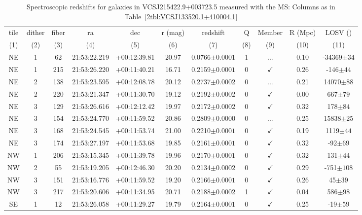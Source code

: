 \begin{landscape}
	\begin{table}
		\centering 
		\caption[Spectroscopic redshifts for galaxies in VCSJ215422.9+003723.5]{Spectroscopic redshifts for galaxies in VCSJ215422.9+003723.5 measured with the MS: Columns as in Table~\ref{2tbl:VCSJ133520.1+410004.1}}
		\begin{tabular}{ccccccccccc}
			\hline
			tile & dither & fiber & ra & dec & r (mag) & redshift & Q & Member & R (Mpc) & LOSV (\kms) \\
			(1) & (2) & (3) & (4) & (5) & (6) & (7) & (8) & (9) & (10) & (11) \\
			\hline \hline
	NE & 1 & 62 & 21:53:22.219 & +00:12:39.81 & 20.97 & 0.0766$\pm{0.0001}$ & 1 & ... & 0.10 & -34369$\pm{34}$ \\
	NE & 1 & 215 & 21:53:26.220 & +00:11:40.21 & 16.71 & 0.2159$\pm{0.0001}$ & 0 & $\checkmark$ & 0.26 & -146$\pm{44}$ \\
	NE & 2 & 138 & 21:53:23.595 & +00:12:08.78 & 20.12 & 0.2737$\pm{0.0002}$ & 0 & ... & 0.21 & 14070$\pm{88}$ \\
	NE & 2 & 220 & 21:53:21.347 & +00:11:30.70 & 19.12 & 0.2192$\pm{0.0002}$ & 0 & $\checkmark$ & 0.00 & 667$\pm{79}$ \\
	NE & 3 & 129 & 21:53:26.616 & +00:12:12.42 & 19.97 & 0.2172$\pm{0.0002}$ & 0 & $\checkmark$ & 0.32 & 178$\pm{84}$ \\
	NE & 3 & 154 & 21:53:24.770 & +00:11:59.52 & 20.86 & 0.2809$\pm{0.0000}$ & 0 & ... & 0.25 & 15838$\pm{25}$ \\
	NE & 3 & 168 & 21:53:24.545 & +00:11:53.74 & 21.00 & 0.2210$\pm{0.0001}$ & 0 & $\checkmark$ & 0.19 & 1119$\pm{44}$ \\
	NE & 3 & 174 & 21:53:27.197 & +00:11:53.68 & 19.85 & 0.2161$\pm{0.0001}$ & 0 & $\checkmark$ & 0.32 & -92$\pm{69}$ \\
	NW & 1 & 206 & 21:53:15.345 & +00:11:39.78 & 19.96 & 0.2170$\pm{0.0001}$ & 0 & $\checkmark$ & 0.32 & 131$\pm{44}$ \\
	NW & 2 & 55 & 21:53:19.205 & +00:12:46.30 & 20.20 & 0.2134$\pm{0.0002}$ & 0 & $\checkmark$ & 0.29 & -751$\pm{108}$ \\
	NW & 3 & 151 & 21:53:16.776 & +00:11:59.52 & 19.20 & 0.2166$\pm{0.0001}$ & 0 & $\checkmark$ & 0.26 & 45$\pm{39}$ \\
	NW & 3 & 217 & 21:53:20.606 & +00:11:34.95 & 20.71 & 0.2188$\pm{0.0002}$ & 1 & $\checkmark$ & 0.04 & 586$\pm{98}$ \\
	SE & 1 & 12 & 21:53:26.058 & +00:11:29.27 & 19.79 & 0.2164$\pm{0.0001}$ & 0 & $\checkmark$ & 0.25 & -19$\pm{59}$ \\

\end{tabular}
\end{table}
\end{landscape}
